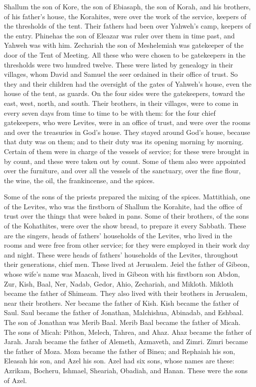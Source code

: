 {Shallum the son of Kore, the son of Ebiasaph, the son of Korah, and his brothers, of his father’s house, the Korahites, were over the work of the service, keepers of the thresholds of the tent. Their fathers had been over Yahweh’s camp, keepers of the entry.
Phinehas the son of Eleazar was ruler over them in time past, and Yahweh was with him.
Zechariah the son of Meshelemiah was gatekeeper of the door of the Tent of Meeting.
All these who were chosen to be gatekeepers in the thresholds were two hundred twelve. These were listed by genealogy in their villages, whom David and Samuel the seer ordained in their office of trust.
So they and their children had the oversight of the gates of Yahweh’s house, even the house of the tent, as guards.
On the four sides were the gatekeepers, toward the east, west, north, and south.
Their brothers, in their villages, were to come in every seven days from time to time to be with them:
for the four chief gatekeepers, who were Levites, were in an office of trust, and were over the rooms and over the treasuries in God’s house.
They stayed around God’s house, because that duty was on them; and to their duty was its opening morning by morning.
Certain of them were in charge of the vessels of service; for these were brought in by count, and these were taken out by count.
Some of them also were appointed over the furniture, and over all the vessels of the sanctuary, over the fine flour, the wine, the oil, the frankincense, and the spices.
\par }{\PP {}Some of the sons of the priests prepared the mixing of the spices.
Mattithiah, one of the Levites, who was the firstborn of Shallum the Korahite, had the office of trust over the things that were baked in pans.
Some of their brothers, of the sons of the Kohathites, were over the show bread, to prepare it every Sabbath.
These are the singers, heads of fathers’ households of the Levites, who lived in the rooms and were free from other service; for they were employed in their work day and night.
These were heads of fathers’ households of the Levites, throughout their generations, chief men. These lived at Jerusalem.
Jeiel the father of Gibeon, whose wife’s name was Maacah, lived in Gibeon with
his firstborn son Abdon, Zur, Kish, Baal, Ner, Nadab,
Gedor, Ahio, Zechariah, and Mikloth.
Mikloth became the father of Shimeam. They also lived with their brothers in Jerusalem, near their brothers.
Ner became the father of Kish. Kish became the father of Saul. Saul became the father of Jonathan, Malchishua, Abinadab, and Eshbaal.
The son of Jonathan was Merib Baal. Merib Baal became the father of Micah.
The sons of Micah: Pithon, Melech, Tahrea, and Ahaz.
Ahaz became the father of Jarah. Jarah became the father of Alemeth, Azmaveth, and Zimri. Zimri became the father of Moza.
Moza became the father of Binea; and Rephaiah his son, Eleasah his son, and Azel his son.
Azel had six sons, whose names are these: Azrikam, Bocheru, Ishmael, Sheariah, Obadiah, and Hanan. These were the sons of Azel.

}
